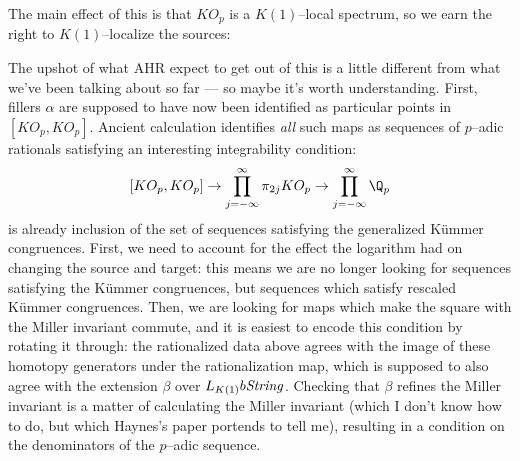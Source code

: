 The main effect of this is that $KO_p$ is a $K(1)$--local spectrum, so we earn the right to $K(1)$--localize the sources:
\begin{center}
\end{center}

The upshot of what AHR expect to get out of this is a little different from what we've been talking about so far --- so maybe it's worth understanding.  First, fillers $\alpha$ are supposed to have now been identified as particular points in $[KO_p, KO_p]$.  Ancient calculation identifies \emph{all} such maps as sequences of $p$--adic rationals satisfying an interesting integrability condition: \[[KO_p, KO_p] \to \prod_{j=-\infty}^\infty \pi_{2j} KO_p \to \prod_{j=-\infty}^\infty \Q_p\] is already inclusion of the set of sequences satisfying the generalized K\"ummer congruences.  First, we need to account for the effect the logarithm had on changing the source and target: this means we are no longer looking for sequences satisfying the K\"ummer congruences, but sequences which satisfy rescaled K\"ummer congruences.  Then, we are looking for maps which make the square with the Miller invariant commute, and it is easiest to encode this condition by rotating it through: the rationalized data above agrees with the image of these homotopy generators under the rationalization map, which is supposed to also agree with the extension $\beta$ over $L_{K(1)} b\mathit{String}$.  Checking that $\beta$ refines the Miller invariant is a matter of calculating the Miller invariant (which I don't know how to do, but which Haynes's paper portends to tell me), resulting in a condition on the denominators of the $p$--adic sequence.

